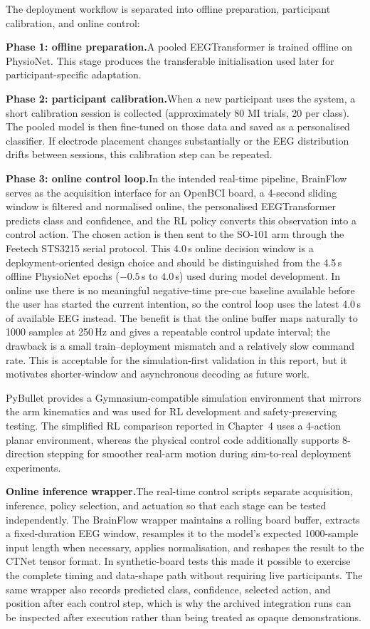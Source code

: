 \documentclass[12pt, a4paper]{article}
\begin{document}
The deployment workflow is separated into offline preparation, participant calibration, and online control:

\textbf{Phase 1: offline preparation.}\quad A pooled EEGTransformer is trained offline on PhysioNet. This stage produces the transferable initialisation used later for participant-specific adaptation.

\textbf{Phase 2: participant calibration.}\quad When a new participant uses the system, a short calibration session is collected (approximately 80 MI trials, 20 per class). The pooled model is then fine-tuned on those data and saved as a personalised classifier. If electrode placement changes substantially or the EEG distribution drifts between sessions, this calibration step can be repeated.

\textbf{Phase 3: online control loop.}\quad In the intended real-time pipeline, BrainFlow serves as the acquisition interface for an OpenBCI board, a 4-second sliding window is filtered and normalised online, the personalised EEGTransformer predicts class and confidence, and the RL policy converts this observation into a control action. The chosen action is then sent to the SO-101 arm through the Feetech STS3215 serial protocol. This 4.0\,s online decision window is a deployment-oriented design choice and should be distinguished from the 4.5\,s offline PhysioNet epochs ($-0.5$\,s to $4.0$\,s) used during model development. In online use there is no meaningful negative-time pre-cue baseline available before the user has started the current intention, so the control loop uses the latest 4.0\,s of available EEG instead. The benefit is that the online buffer maps naturally to 1000 samples at 250\,Hz and gives a repeatable control update interval; the drawback is a small train--deployment mismatch and a relatively slow command rate. This is acceptable for the simulation-first validation in this report, but it motivates shorter-window and asynchronous decoding as future work.

PyBullet provides a Gymnasium-compatible simulation environment that mirrors the arm kinematics and was used for RL development and safety-preserving testing. The simplified RL comparison reported in Chapter~4 uses a 4-action planar environment, whereas the physical control code additionally supports 8-direction stepping for smoother real-arm motion during sim-to-real deployment experiments.

\textbf{Online inference wrapper.}\quad The real-time control scripts separate acquisition, inference, policy selection, and actuation so that each stage can be tested independently. The BrainFlow wrapper maintains a rolling board buffer, extracts a fixed-duration EEG window, resamples it to the model's expected 1000-sample input length when necessary, applies normalisation, and reshapes the result to the CTNet tensor format. In synthetic-board tests this made it possible to exercise the complete timing and data-shape path without requiring live participants. The same wrapper also records predicted class, confidence, selected action, and position after each control step, which is why the archived integration runs can be inspected after execution rather than being treated as opaque demonstrations.
\end{document}
